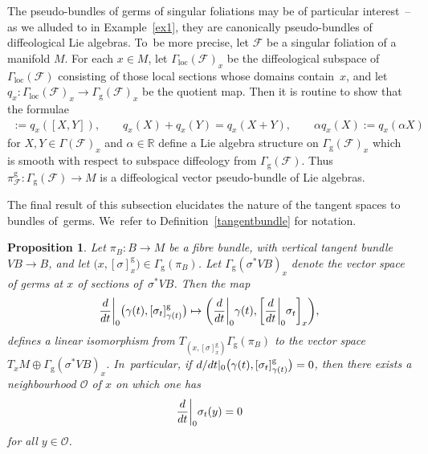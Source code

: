 \documentclass[11pt]{article}
\numberwithin{equation}{section}
\numberwithin{equation}{section}
\newtheorem{Proposition}[Theorem]{Proposition}
\def\loc{\operatorname{loc}}
\def\g{\operatorname{g}}
\def\FF{{\mathcal{F}}}
\def\OO{{\mathcal{O}}}
\def\RB{{\mathbb{R}}}
\begin{document}
\begin{Remark}
The pseudo-bundles of germs of singular foliations may be of particular interest~-- as we alluded to in Example~\ref{ex1}, they are canonically pseudo-bundles of diffeological Lie algebras. To~be more precise, let $\FF$ be a singular foliation of a manifold $M$. For each $x\in M$, let $\Gamma_{\loc}(\FF)_{x}$ be the diffeological subspace of $\Gamma_{\loc}(\FF)$ consisting of those local sections whose domains con\-tain~$x$, and let $q_{x}\colon \Gamma_{\loc}(\FF)_{x}\rightarrow\Gamma_{\g}(\FF)_{x}$ be the quotient map. Then it is routine to show that the formulae
\begin{gather*}
[q_{x}(X),q_{x}(Y)]:=q_{x}([X,Y]),\qquad
q_{x}(X)+q_{x}(Y) =q_{x}(X+Y),\qquad
\alpha q_{x}(X):=q_{x}(\alpha X)
\end{gather*}
for $X,Y\in\Gamma(\FF)_{x}$ and $\alpha\in\RB$ define a Lie algebra structure on $\Gamma_{\g}(\FF)_{x}$ which is smooth with respect to subspace diffeology from $\Gamma_{\g}(\FF)$. Thus $\pi_{\FF}^{\g}\colon \Gamma_{\g}(\FF)\rightarrow M$ is a diffeological vector pseudo-bundle of Lie algebras.
\end{Remark}

The final result of this subsection elucidates the nature of the tangent spaces to bundles of~germs. We~refer to Definition~\ref{tangentbundle} for notation.

\begin{Proposition}\label{tangentgerm}
Let $\pi_{B}\colon B\rightarrow M$ be a fibre bundle, with vertical tangent bundle $VB\rightarrow B$, and let $\big(x,[\sigma]^{\g}_{x}\big)\in\Gamma_{\g}(\pi_{B})$. Let $\Gamma_{\g}(\sigma^{*}VB)_{x}$ denote the vector space of germs at $x$ of sections of~$\sigma^{*}VB$. Then the map
\begin{gather}\label{tangerm}
\frac{\rm d}{{\rm d}t}\bigg|_{0}\big(\gamma(t),[\sigma_{t}]^{\g}_{\gamma(t)}\big) \mapsto \bigg(\frac{\rm d}{{\rm d}t}\bigg|_{0}\gamma(t),\bigg[\frac{\rm d}{{\rm d}t}\bigg|_{0}\sigma_{t}\bigg]_{x}\bigg),
\end{gather}
defines a linear isomorphism from $T_{\left(x,[\sigma]^{\g}_{x}\right)}\Gamma_{\g}(\pi_{B})$ to the vector space $T_{x}M\oplus\Gamma_{\g}(\sigma^{*}VB)_{x}$. In~particular, if ${\rm d}/{\rm d}t|_{0}\big(\gamma(t),[\sigma_{t}]^{\g}_{\gamma(t)}\big) = 0$, then there exists a neighbourhood $\OO$ of $x$ on which one has
\begin{gather*}
\frac{\rm d}{{\rm d}t}\bigg|_{0}\sigma_{t}(y) = 0
\end{gather*}
for all $y\in\OO$.
\end{Proposition}
\end{document}
